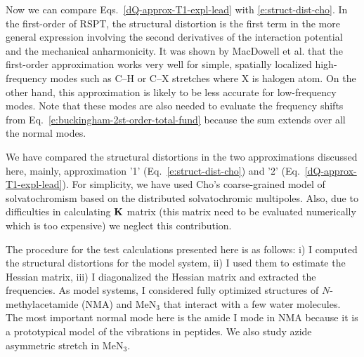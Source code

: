 \documentclass[a4paper,titlepage,twoside,fleqn,12pt]{book}
\begin{document}
\begin{refsection}
Now we can compare Eqs.~\eqref{dQ-approx-T1-expl-lead} with \eqref{e:struct-dist-cho}.
In the first\hyp{}order of RSPT, the structural distortion is the first term
in the more general expression involving the second 
derivatives of the interaction potential and the mechanical anharmonicity.
It was shown by MacDowell et al. that the first\hyp{}order approximation works 
very well for simple, spatially localized high\hyp{}frequency modes such as
C--H or C--X stretches where X is halogen atom. On the other hand, this
approximation is likely to be less accurate for low\hyp{}frequency modes.
Note that these modes are also needed to evaluate the frequency shifts
from Eq.~\eqref{e:buckingham-2st-order-total-fund} because the sum extends over
all the normal modes.

We have compared the structural distortions in the two approximations
discussed here, mainly, approximation '1' (Eq.~\eqref{e:struct-dist-cho}) and 
'2' (Eq.~\eqref{dQ-approx-T1-expl-lead}). For simplicity, we have used Cho's coarse\hyp{}grained
model of solvatochromism based on the distributed solvatochromic multipoles. 
Also, due to difficulties in calculating $\bf K$ matrix (this matrix need to
be evaluated numerically which is too expensive) we neglect this contribution. 

The procedure for the test calculations presented here is as follows: i) 
I computed the structural distortions for the model system, ii) I used them to estimate
the Hessian matrix, iii) I diagonalized the Hessian matrix and extracted the frequencies.
As model systems, I considered fully optimized structures of $N$-methylacetamide (NMA) 
and MeN$_3$ 
that interact with a few water molecules.
The most important normal mode here is the amide I mode in NMA
because it is a prototypical model of the vibrations in peptides.
We also study azide asymmetric
stretch in MeN$_3$.


\end{refsection}
\end{document}

